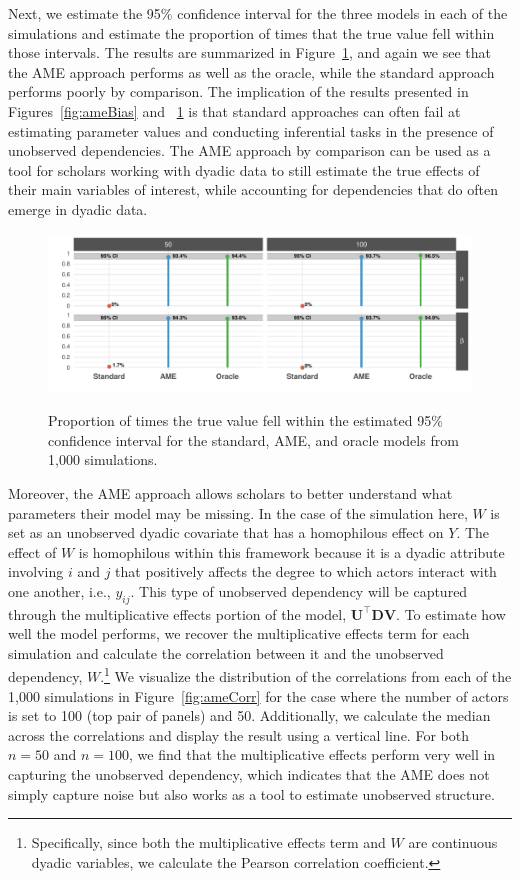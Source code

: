 Next, we estimate the 95\% confidence interval for the three models in each of the simulations and estimate the proportion of times that the true value fell within those intervals. The results are summarized in Figure~\ref{fig:ameCalib}, and again we see that the AME approach performs as well as the oracle, while the standard approach performs poorly by comparison. The implication of the results presented in Figures~\ref{fig:ameBias} and ~\ref{fig:ameCalib} is that standard approaches can often fail at estimating parameter values and conducting inferential tasks in the presence of unobserved dependencies. The AME approach by comparison can be used as a tool for scholars working with dyadic data to still estimate the true effects of their main variables of interest, while accounting for dependencies that do often emerge in dyadic data. 

\begin{figure}
	\centering
	\caption{Proportion of times the true value fell within the estimated 95\% confidence interval for the standard, AME, and oracle models from 1,000 simulations.}
	\label{fig:ameCalib}
	\includegraphics[width=1\textwidth]{graphics/ameSimCover_all.pdf} \\
\end{figure}

Moreover, the AME approach allows scholars to better understand what parameters their model may be missing. In the case of the simulation here, $W$ is set as an unobserved dyadic covariate that has a homophilous effect on $Y$. The effect of $W$ is homophilous within this framework because it is a dyadic attribute involving $i$ and $j$ that positively affects the degree to which actors interact with one another, i.e., $y_{ij}$. This type of unobserved dependency will be captured through the multiplicative effects portion of the model, $\mathbf{U}^{\top} \mathbf{D} \mathbf{V}$. To estimate how well the model performs, we recover the multiplicative effects term for each simulation and calculate the correlation between it and the unobserved dependency, $W$.\footnote{Specifically, since both the multiplicative effects term and $W$ are continuous dyadic variables, we calculate the Pearson correlation coefficient.} We visualize the distribution of the correlations from each of the 1,000 simulations in Figure~\ref{fig:ameCorr} for the case where the number of actors is set to 100 (top pair of panels) and 50. Additionally, we calculate the median across the correlations and display the result using a vertical line. For both $n=50$ and $n=100$, we find that the multiplicative effects perform very well in capturing the unobserved dependency, which indicates that the AME does not simply capture noise but also works as a tool to estimate unobserved structure. 

